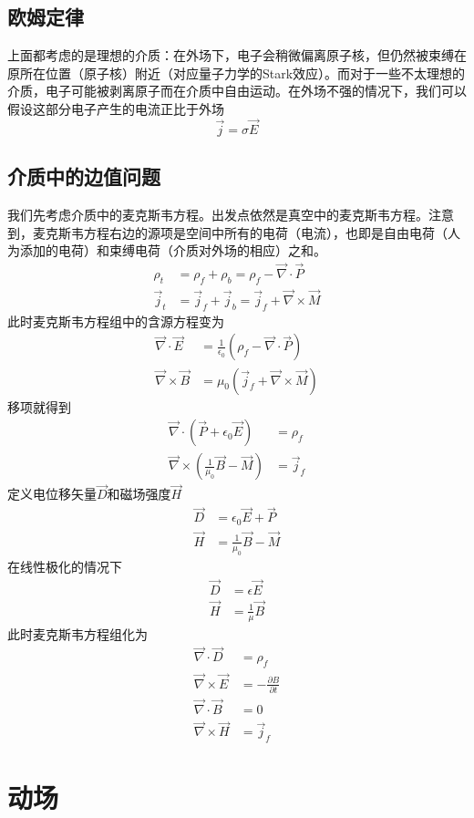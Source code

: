 \documentclass[a4paper,11pt]{ctexart}
\newcommand{\beq}{\begin{equation}}
\newcommand{\eeq}{\end{equation}}
\newcommand{\bea}{\begin{equation}\begin{aligned}}
\newcommand{\eea}{\end{aligned}\end{equation}}
\newcommand{\del}{\vec{\nabla}}
\newcommand{\epv}{\epsilon_0}
\begin{document}
 \subsection{欧姆定律}
 上面都考虑的是理想的介质：在外场下，电子会稍微偏离原子核，但仍然被束缚在原所在位置（原子核）附近（对应量子力学的Stark效应）。而对于一些不太理想的介质，电子可能被剥离原子而在介质中自由运动。在外场不强的情况下，我们可以假设这部分电子产生的电流正比于外场
 \beq
 \vec j = \sigma \vec E
 \eeq
 \subsection{介质中的边值问题}
 我们先考虑介质中的麦克斯韦方程。出发点依然是真空中的麦克斯韦方程。注意到，麦克斯韦方程右边的源项是空间中所有的电荷（电流），也即是自由电荷（人为添加的电荷）和束缚电荷（介质对外场的相应）之和。
 \bea
 \rho_t &= \rho_f + \rho_b  = \rho_f - \del \cdot \vec P\\
\vec{j}_t &= \vec{j}_f + \vec{j}_b = \vec{j}_f + \del \times \vec{M}
\eea
此时麦克斯韦方程组中的含源方程变为
\bea
\del \cdot \vec E &= \frac{1}{\epv}(\rho_f - \del \cdot \vec P) \\
\del \times \vec B &= \mu_0 ( \vec{j}_f + \del \times \vec{M})
\eea
移项就得到
\bea
\del \cdot \left(\vec P  + \epv \vec E \right) &= \rho_f \\
\del \times \left( \frac{1}{\mu_0} \vec B- \vec M\right) &= \vec{j}_f
\eea
定义电位移矢量$\vec D$和磁场强度$\vec H$
\bea
\vec D &= \epv \vec E + \vec P \\
\vec H &= \frac{1}{\mu_0} \vec B - \vec M
\eea
在线性极化的情况下
\bea
\vec D &= \epsilon \vec E\\
\vec H &= \frac{1}{\mu} \vec B
\eea
此时麦克斯韦方程组化为
\bea
\del \cdot \vec D &= \rho_f \\
\del \times \vec E &= - \frac{\partial B}{\partial t} \\
\del \cdot \vec B &= 0 \\
\del \times \vec H &= \vec{j}_f
\eea




\section{动场}
\end{document}
